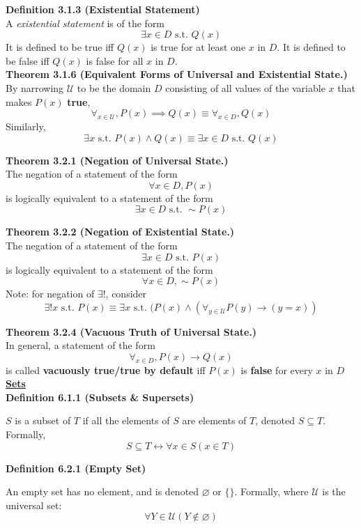 \documentclass[a4paper]{article}
\newcommand{\heading}[1]{{\small\underline{\textbf{#1}}}}
\newcommand{\subheading}[1]{{\scriptsize\textbf{#1}}}
\begin{document}
\begin{multicols*}{4}
\subheading{Definition 3.1.3 (Existential Statement)}\\
A \textit{existential statement} is of the form $$\exists x \in D \text{ s.t. }
Q(x)$$ It is defined to be true iff $Q(x)$ is true for at least one $x$ in $D$.
It is defined to be false iff $Q(x)$ is false for all $x$ in $D$.\\

\subheading{Theorem 3.1.6 (Equivalent Forms of Universal and Existential State.)}\\
By narrowing $\mathcal{U}$ to be the domain $D$ consisting of all values of the variable $x$ that makes $P(x)$ \textbf{true},
  $$ \forall_{x \in \mathcal{U}}, P(x) \implies Q(x) \equiv \forall_{x \in D}, Q(x) $$
Similarly,
  $$ \exists x \text{ s.t. } P(x) \land Q(x) \equiv \exists x \in D \text{ s.t. } Q(x) $$

\subheading{Theorem 3.2.1 (Negation of Universal State.)}\\
The negation of a statement of the form $$\forall x \in D, P(x)$$ is logically
equivalent to a statement of the form $$\exists x \in D \text{ s.t. } \sim
P(x)$$

\subheading{Theorem 3.2.2 (Negation of Existential State.)}\\
The negation of a statement of the form 
  $$\exists x \in D \text{ s.t. } P(x)$$
is logically equivalent to a statement of the form
  $$\forall x \in D, \sim P(x)$$
Note: for negation of $\exists!$, consider
  $$\exists! x \text{ s.t. } P(x) \equiv \exists x \text{ s.t. } (P(x) \land (\forall_{y \in \mathcal{U}} P(y) \rightarrow (y=x)) $$

\subheading{Theorem 3.2.4 (Vacuous Truth of Universal State.)}\\
In general, a statement of the form
  $$\forall_{x \in D}, P(x) \rightarrow Q(x) $$
is called \textbf{vacuously true/true by default} iff $P(x)$ is \textbf{false} for every $x$ in $D$\\

\heading{Sets} \\

\subheading{Definition 6.1.1 (Subsets \& Supersets)}

$S$ is a subset of $T$ if all the elements of $S$ are elements of $T$, denoted
$S \subseteq T$. Formally, $$S \subseteq T \longleftrightarrow \forall x \in S
(x \in T)$$

\subheading{Definition 6.2.1 (Empty Set)}

An empty set has no element, and is denoted $\varnothing$ or $\{\}$. Formally,
where $\mathcal{U}$ is the universal set: $$\forall Y \in \mathcal{U} (Y \not\in
\varnothing)$$


\end{multicols*}
\end{document}
